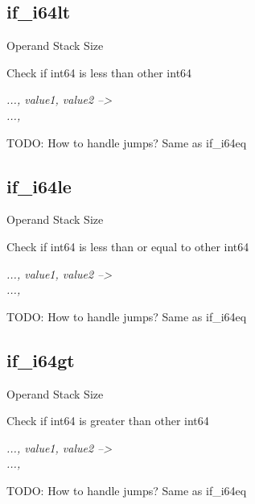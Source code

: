 \documentclass[12pt]{article}
\begin{document}
		\subsection*{if\_i64lt}
			\begin{labeling}{Operand Stack Size}
				\item [\textbf{Operation}] Check if int64 is less than other int64
				\item [\textbf{Format}] 
				\item [\textbf{Operand Stack}] \textit{..., value1, value2 --\textgreater} \\
										\textit{..., }
				\item [\textbf{Description}] TODO: How to handle jumps? Same as if\_i64eq
			\end{labeling}	
		\newpage
		
		\subsection*{if\_i64le}
			\begin{labeling}{Operand Stack Size}
				\item [\textbf{Operation}] Check if int64 is less than or equal to other int64
				\item [\textbf{Format}] 
				\item [\textbf{Operand Stack}] \textit{..., value1, value2 --\textgreater} \\
										\textit{..., }
				\item [\textbf{Description}] TODO: How to handle jumps? Same as if\_i64eq
			\end{labeling}	
		\newpage
		\subsection*{if\_i64gt}
			\begin{labeling}{Operand Stack Size}
				\item [\textbf{Operation}] Check if int64 is greater than other int64
				\item [\textbf{Format}] 
				\item [\textbf{Operand Stack}] \textit{..., value1, value2 --\textgreater} \\
										\textit{..., }
				\item [\textbf{Description}] TODO: How to handle jumps? Same as if\_i64eq
			\end{labeling}	
		\newpage
		
\end{document}
